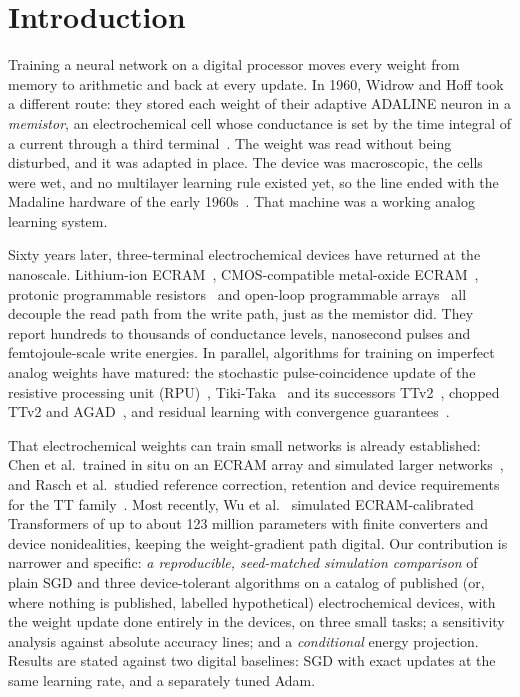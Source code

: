 \section{Introduction}\label{sec:intro}

Training a neural network on a digital processor moves every weight from memory to arithmetic and back at every update.
In 1960, Widrow and Hoff took a different route: they stored each weight of their adaptive ADALINE neuron in a
\emph{memistor}, an electrochemical cell whose conductance is set by the time integral of a current through a third
terminal~\cite{widrow1960adaline,widrow1960switching,widrow1990}. The weight was read without being disturbed, and it was
adapted in place. The device was macroscopic, the cells were wet, and no multilayer learning rule existed yet, so the line ended
with the Madaline hardware of the early 1960s~\cite{widrow1990}. That machine was a working analog learning system.

Sixty years later, three-terminal electrochemical devices have returned at the nanoscale. Lithium-ion
ECRAM~\cite{tang2018,fuller2017}, CMOS-compatible metal-oxide ECRAM~\cite{kim2019}, protonic programmable
resistors~\cite{onen2022,xu2026} and open-loop programmable arrays~\cite{chen2023} all decouple the read path from the write path,
just as the memistor did. They report hundreds to thousands of conductance levels, nanosecond pulses and femtojoule-scale write
energies. In parallel, algorithms for training on imperfect analog weights have matured: the stochastic pulse-coincidence update
of the resistive processing unit (RPU)~\cite{gokmen2016}, Tiki-Taka~\cite{gokmen2020} and its successors
TTv2~\cite{gokmen2021}, chopped TTv2 and AGAD~\cite{rasch2024}, and residual learning with convergence guarantees~\cite{wu2025}.

That electrochemical weights can train small networks is already established: Chen et al.\ trained in situ on an ECRAM array and
simulated larger networks~\cite{chen2023}, and Rasch et al.\ studied reference correction, retention and device requirements for
the TT family~\cite{rasch2024}. Most recently, Wu et al.~\cite{wu2026scale} simulated ECRAM-calibrated Transformers of up to about
123 million parameters with finite converters and device nonidealities, keeping the weight-gradient path digital. Our
contribution is narrower and specific: \emph{a reproducible, seed-matched simulation comparison} of plain SGD and three
device-tolerant algorithms on a catalog of published (or, where nothing is published, labelled hypothetical) electrochemical
devices, with the weight update done entirely in the devices, on three small tasks; a sensitivity analysis against absolute
accuracy lines; and a \emph{conditional} energy projection. Results are stated against two digital baselines: SGD with exact
updates at the same learning rate, and a separately tuned Adam.

